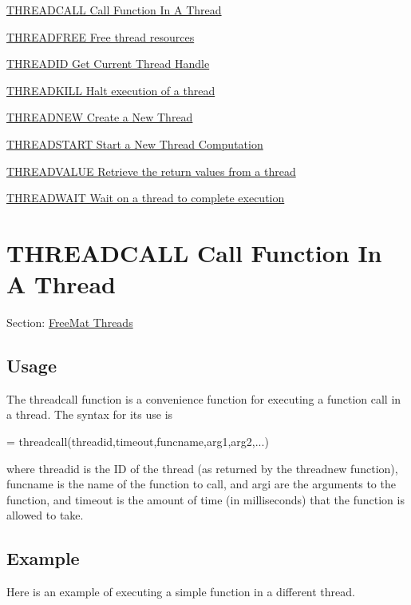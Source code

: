 
\begin{DoxyItemize}
\item \hyperlink{thread_threadcall}{T\-H\-R\-E\-A\-D\-C\-A\-L\-L Call Function In A Thread}  
\item \hyperlink{thread_threadfree}{T\-H\-R\-E\-A\-D\-F\-R\-E\-E Free thread resources}  
\item \hyperlink{thread_threadid}{T\-H\-R\-E\-A\-D\-I\-D Get Current Thread Handle}  
\item \hyperlink{thread_threadkill}{T\-H\-R\-E\-A\-D\-K\-I\-L\-L Halt execution of a thread}  
\item \hyperlink{thread_threadnew}{T\-H\-R\-E\-A\-D\-N\-E\-W Create a New Thread}  
\item \hyperlink{thread_threadstart}{T\-H\-R\-E\-A\-D\-S\-T\-A\-R\-T Start a New Thread Computation}  
\item \hyperlink{thread_threadvalue}{T\-H\-R\-E\-A\-D\-V\-A\-L\-U\-E Retrieve the return values from a thread}  
\item \hyperlink{thread_threadwait}{T\-H\-R\-E\-A\-D\-W\-A\-I\-T Wait on a thread to complete execution}  
\end{DoxyItemize}\hypertarget{thread_threadcall}{}\section{T\-H\-R\-E\-A\-D\-C\-A\-L\-L Call Function In A Thread}\label{thread_threadcall}
Section\-: \hyperlink{sec_thread}{Free\-Mat Threads} \hypertarget{vtkwidgets_vtkxyplotwidget_Usage}{}\subsection{Usage}\label{vtkwidgets_vtkxyplotwidget_Usage}
The {\ttfamily threadcall} function is a convenience function for executing a function call in a thread. The syntax for its use is \begin{DoxyVerb}    = threadcall(threadid,timeout,funcname,arg1,arg2,...)
\end{DoxyVerb}
 where {\ttfamily threadid} is the I\-D of the thread (as returned by the {\ttfamily threadnew} function), {\ttfamily funcname} is the name of the function to call, and {\ttfamily argi} are the arguments to the function, and {\ttfamily timeout} is the amount of time (in milliseconds) that the function is allowed to take. \hypertarget{variables_struct_Example}{}\subsection{Example}\label{variables_struct_Example}
Here is an example of executing a simple function in a different thread.


